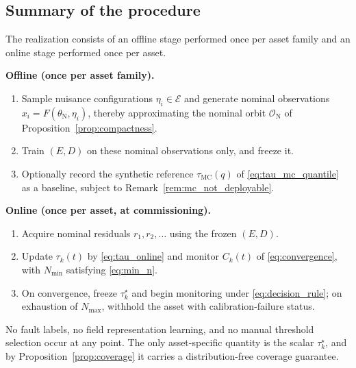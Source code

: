 \documentclass[a4paper]{cas-sc}
\newcommand{\EtaSpace}{\ensuremath{\mathcal{E}}}
\newcommand{\residual}{\ensuremath{r}}
\newcommand{\taumc}{\ensuremath{\tau_{\mathrm{MC}}}}
\begin{document}
\subsection{Summary of the procedure}
\label{subsec:procedure_summary}

The realization consists of an offline stage performed once per asset
family and an online stage performed once per asset.

\noindent\textbf{Offline (once per asset family).}
\begin{enumerate}[leftmargin=1.8em]
\item Sample nuisance configurations \(\eta_i\in\EtaSpace\) and generate
      nominal observations \(x_i=F(\theta_{\mathrm{N}},\eta_i)\), thereby
      approximating the nominal orbit \(\mathcal{O}_{\mathrm N}\) of
      Proposition~\ref{prop:compactness}.
\item Train \((E,D)\) on these nominal observations only, and freeze it.
\item Optionally record the synthetic reference \(\taumc(q)\) of
      \eqref{eq:tau_mc_quantile} as a baseline, subject to
      Remark~\ref{rem:mc_not_deployable}.
\end{enumerate}

\noindent\textbf{Online (once per asset, at commissioning).}
\begin{enumerate}[leftmargin=1.8em]
\item Acquire nominal residuals \(\residual_1,\residual_2,\ldots\) using
      the frozen \((E,D)\).
\item Update \(\tau_k(t)\) by \eqref{eq:tau_online} and monitor
      \(C_k(t)\) of \eqref{eq:convergence}, with
      \(N_{\min}\) satisfying \eqref{eq:min_n}.
\item On convergence, freeze \(\tau_k^\star\) and begin monitoring under
      \eqref{eq:decision_rule}; on exhaustion of \(N_{\max}\), withhold the
      asset with calibration-failure status.
\end{enumerate}

No fault labels, no field representation learning, and no manual threshold
selection occur at any point. The only asset-specific quantity is the
scalar \(\tau_k^\star\), and by Proposition~\ref{prop:coverage} it carries
a distribution-free coverage guarantee.

\end{document}
